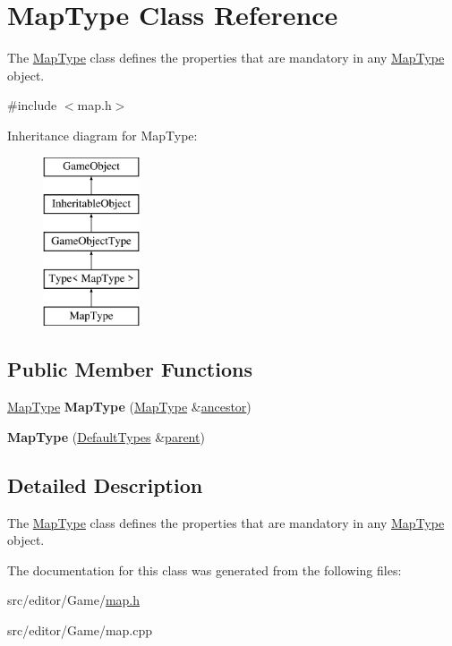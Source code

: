 \hypertarget{class_map_type}{\section{\-Map\-Type \-Class \-Reference}
\label{class_map_type}
}


\-The \hyperlink{class_map_type}{\-Map\-Type} class defines the properties that are mandatory in any \hyperlink{class_map_type}{\-Map\-Type} object.  




{\ttfamily \#include $<$map.\-h$>$}

\-Inheritance diagram for \-Map\-Type\-:\begin{figure}[H]
\begin{center}
\leavevmode
\includegraphics[height=5.000000cm]{class_map_type}
\end{center}
\end{figure}
\subsection*{\-Public \-Member \-Functions}
\begin{DoxyCompactItemize}
\item 
\hypertarget{class_map_type_aa2304487b4989920021c656d404ad893}{\hyperlink{class_map_type}{\-Map\-Type} {\bfseries \-Map\-Type} (\hyperlink{class_map_type}{\-Map\-Type} \&\hyperlink{class_inheritable_object_a10eead70368227b7f15f44f91d234fa5}{ancestor})}\label{class_map_type_aa2304487b4989920021c656d404ad893}

\item 
\hypertarget{class_map_type_affc4d021aa814cfc93096498b0395ba2}{{\bfseries \-Map\-Type} (\hyperlink{class_default_types}{\-Default\-Types} \&\hyperlink{class_game_object_af3deaf39cde23c189765634e32e95bb4}{parent})}\label{class_map_type_affc4d021aa814cfc93096498b0395ba2}

\end{DoxyCompactItemize}


\subsection{\-Detailed \-Description}
\-The \hyperlink{class_map_type}{\-Map\-Type} class defines the properties that are mandatory in any \hyperlink{class_map_type}{\-Map\-Type} object. 

\-The documentation for this class was generated from the following files\-:\begin{DoxyCompactItemize}
\item 
src/editor/\-Game/\hyperlink{map_8h}{map.\-h}\item 
src/editor/\-Game/map.\-cpp\end{DoxyCompactItemize}
